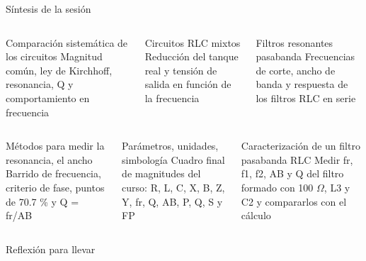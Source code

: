 \documentclass[aspectratio=169,11pt,xcolor={table}]{beamer}
\begin{document}
\begin{frame}{Síntesis de la sesión}
\begin{columns}[T,onlytextwidth]
\begin{cardB}{Comparación sistemática de los circuitos}
\scriptsize Magnitud común, ley de Kirchhoff, resonancia, Q y comportamiento en frecuencia
\end{cardB}
\begin{cardO}{Circuitos RLC mixtos}
\scriptsize Reducción del tanque real y tensión de salida en función de la frecuencia
\end{cardO}
\begin{cardG}{Filtros resonantes pasabanda}
\scriptsize Frecuencias de corte, ancho de banda y respuesta de los filtros RLC en serie
\end{cardG}
\end{columns}
\vspace{2mm}
\begin{columns}[T,onlytextwidth]
\begin{cardB}{Métodos para medir la resonancia, el ancho}
\scriptsize Barrido de frecuencia, criterio de fase, puntos de 70.7 \% y Q = fr/AB
\end{cardB}
\begin{cardO}{Parámetros, unidades, simbología}
\scriptsize Cuadro final de magnitudes del curso: R, L, C, X, B, Z, Y, fr, Q, AB, P, Q, S y FP
\end{cardO}
\begin{cardG}{Caracterización de un filtro pasabanda RLC}
\scriptsize Medir fr, f1, f2, AB y Q del filtro formado con 100 \ensuremath{\Omega}, L3 y C2 y compararlos con el cálculo
\end{cardG}
\end{columns}
\end{frame}

\begin{frame}{Reflexión para llevar}
\centering
{}
\end{frame}
\end{document}

